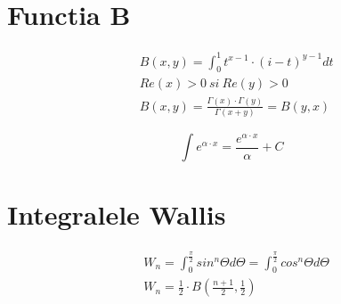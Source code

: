 \documentclass[oneside]{memoir}
\begin{document}
\section[Functia B]{Functia B}

\begin{center}
    \begin{equation*}
        \begin{split}
&B(x,y) = \int_0^1 t^{x-1}\cdot (i-t)^{y-1}dt\\
&Re(x) > 0\ si \ Re(y) > 0\\
&B(x,y) = \frac{\Gamma(x)\cdot \Gamma(y)}{\Gamma(x+y)} = B(y,x)
        \end{split}
    \end{equation*}
\end{center}

\begin{center}
    \begin{equation*}
\int e^{\alpha\cdot x} = \frac{e^{\alpha\cdot x}}{\alpha} + C
    \end{equation*}
\end{center}

\section[Integralele Wallis]{Integralele Wallis}
\begin{center}
    \begin{equation*}
        \begin{split}
&W_n=\int_0^{\frac{\pi}{2}} sin^n \Theta d\Theta = \int_0^{\frac{\pi}{2}} cos^n \Theta d\Theta\\
&W_n = \frac{1}{2}\cdot B(\frac{n+1}{2},\frac{1}{2})
        \end{split}
    \end{equation*}
\end{center}


\end{document}
